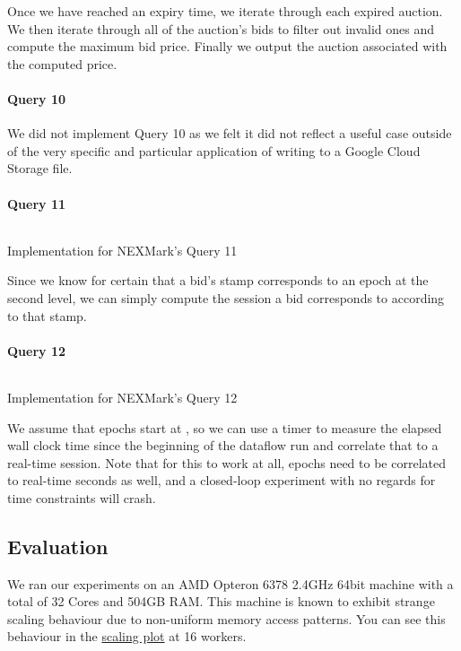 Once we have reached an expiry time, we iterate through each expired auction. We then iterate through all of the auction's bids to filter out invalid ones and compute the maximum bid price. Finally we output the auction associated with the computed price.

\paragraph{Query 10}
We did not implement Query 10 as we felt it did not reflect a useful case outside of the very specific and particular application of writing to a Google Cloud Storage file.

\paragraph{Query 11}
\begin{listing}[H]
  \inputminted[firstline=784,lastline=787]{rust}{benchmarks/src/nexmark.rs}
  \caption{Implementation for NEXMark's Query 11}
  \label{lst:nexmark-query11}
\end{listing}

Since we know for certain that a bid's  stamp corresponds to an epoch at the second level, we can simply compute the session a bid corresponds to according to that stamp.

\paragraph{Query 12}
\begin{listing}[H]
  \inputminted[firstline=810,lastline=817]{rust}{benchmarks/src/nexmark.rs}
  \caption{Implementation for NEXMark's Query 12}
  \label{lst:nexmark-query12}
\end{listing}

We assume that epochs start at , so we can use a timer to measure the elapsed wall clock time since the beginning of the dataflow run and correlate that to a real-time session. Note that for this to work at all, epochs need to be correlated to real-time seconds as well, and a closed-loop experiment with no regards for time constraints will crash.

\subsection{Evaluation}
We ran our experiments on an AMD Opteron 6378 2.4GHz 64bit machine with a total of 32 Cores and 504GB RAM. This machine is known to exhibit strange scaling behaviour due to non-uniform memory access patterns. You can see this behaviour in the \hyperref[figure:ysb-scaling]{scaling plot} at 16 workers. \\


